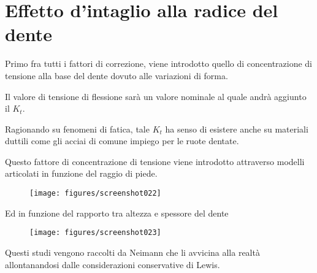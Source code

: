 \documentclass[a4paper, 15pt]{article}
\begin{document}
\section{Effetto d'intaglio alla radice del dente}
\begin{adjustwidth}{2in}{}	
	Primo fra tutti i fattori di correzione, viene introdotto quello di concentrazione di tensione alla base del dente  dovuto alle variazioni di forma. 
	
	Il valore di tensione di flessione sarà un valore nominale al quale andrà aggiunto il $K_t$. 
	
	Ragionando  su fenomeni di fatica, tale $K_t$ ha senso di esistere anche su materiali duttili come  gli acciai di comune impiego per le ruote dentate. \newline 
	
	Questo fattore di concentrazione di tensione viene introdotto attraverso modelli articolati in funzione del raggio di piede. 
	\begin{figure}[H]
		\centering
		\texttt{[image: figures/screenshot022]}
		\label{fig:screenshot022}
	\end{figure}
	Ed in funzione del rapporto tra altezza e spessore del dente
	\begin{figure}[H]
		\centering
		\texttt{[image: figures/screenshot023]}
		\label{fig:screenshot023}
	\end{figure}
	Questi studi vengono raccolti da Neimann che li avvicina alla realtà allontanandosi dalle considerazioni conservative di Lewis. 
\end{adjustwidth}
\newpage
\end{document}
